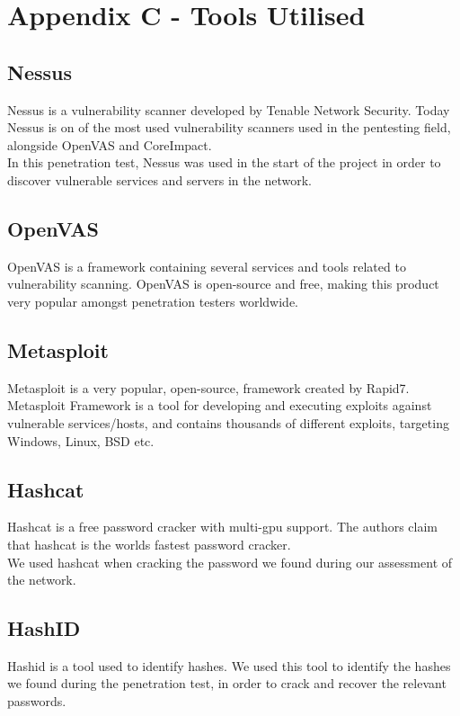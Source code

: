 \section{Appendix C - Tools Utilised}

    \subsection*{Nessus}
    Nessus is a vulnerability scanner developed by Tenable Network Security. Today Nessus is on of the most used vulnerability scanners used in the pentesting field, alongside OpenVAS and CoreImpact.\\
    In this penetration test, Nessus was used in the start of the project in order to discover vulnerable services and servers in the network.
     
    \subsection*{OpenVAS}
    OpenVAS is a framework containing several services and tools related to vulnerability scanning. OpenVAS is open-source and free, making this product very popular amongst penetration testers worldwide.
     
    \subsection*{Metasploit}
    Metasploit is a very popular, open-source, framework created by Rapid7. Metasploit Framework is a tool for developing and executing exploits against vulnerable services/hosts, and contains thousands of different exploits, targeting Windows, Linux, BSD etc.
     
    \subsection*{Hashcat}
    Hashcat is a free password cracker with multi-gpu support. The authors claim that hashcat is the worlds fastest password cracker.\\
    We used hashcat when cracking the password we found during our assessment of the network.
     
    \subsection*{HashID}
    Hashid is a tool used to identify hashes. We used this tool to identify the hashes we found during the penetration test, in order to crack and recover the relevant passwords.
     
